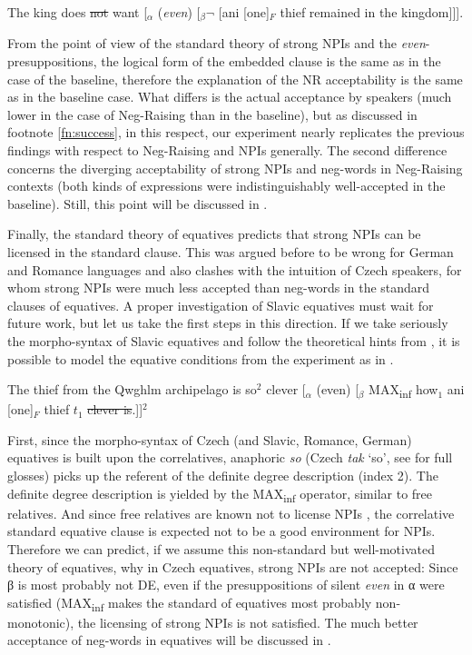 \documentclass[output=paper,colorlinks,citecolor=brown]{langscibook}
\begin{document}
\ea\label{ex-12-nr} The king does \sout{not} want [$_{α}$ (\textit{even}) [$_{β} \neg$ [ani [one]$_F$ thief remained in the kingdom]]].
\z

\noindent From the point of view of the standard theory of strong NPIs and the \textit{even}-presuppositions, the logical form of the embedded clause is the same as in the case of the baseline, therefore the explanation of the NR acceptability is the same as in the baseline case. What differs is the actual acceptance by speakers (much lower in the case of Neg-Raising than in the baseline), but as discussed in footnote \ref{fn:success}, in this respect, our experiment nearly replicates the previous findings with respect to Neg-Raising and NPIs generally. The second difference concerns the diverging acceptability of strong NPIs and neg-words in Neg-Raising contexts (both kinds of expressions were indistinguishably well-accepted in the baseline). Still, this point will be discussed in .

Finally, the standard theory of equatives predicts that strong NPIs can be licensed in the standard clause. This was argued before to be wrong for German and Romance languages \citep{krifka1992some,penka2016degree} and also clashes with the intuition of Czech speakers, for whom strong NPIs were much less accepted than neg-words in the standard clauses of equatives. A proper investigation of Slavic equatives must wait for future work, but let us take the first steps in this direction. If we take seriously the morpho-syntax of Slavic equatives and follow the theoretical hints from \citet{penka2016degree}, it is possible to model the equative conditions from the experiment as in . 

\ea\label{ex-12-eq}The thief from the Qwghlm archipelago is so$^2$ clever [$_{α}$ (even) [$_β$ MAX\textsubscript{inf} how$_1$ ani [one]$_F$ thief $t_1$ \sout{clever is}.]]$^2$
\z

\noindent First, since the morpho-syntax of Czech (and Slavic, Romance, German) equatives is built upon the correlatives, anaphoric \textit{so} (Czech \textit{tak} `so', see  for full glosses) picks up the referent of the definite degree description (index 2). The definite degree description is yielded by the MAX\textsubscript{inf} operator, similar to free relatives. And since free relatives are known not to license NPIs \citep{pauline1995quantificational}, the correlative standard equative clause is expected not to be a good environment for NPIs. Therefore we can predict, if we assume this non-standard but well-motivated theory of equatives, why in Czech equatives, strong NPIs are not accepted: Since β is most probably not DE, even if the presuppositions of silent \textit{even} in α were satisfied (MAX\textsubscript{inf} makes the standard of equatives most probably non-monotonic), the licensing of strong NPIs is not satisfied. The much better acceptance of neg-words in equatives will be discussed in .
\end{document}
